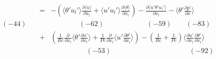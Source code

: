 \documentclass[a4paper,11pt]{article}
\begin{document}
\begin{eqnarray}
&=&-(\langle \theta'u_l'\rangle \frac{\partial \langle u \rangle  }{\partial x_l}
+\langle u'u_l'\rangle \frac{\partial \langle \theta \rangle  }{\partial x_l})
-\frac{\partial \langle u'\theta'u_l'\rangle}{\partial x_l}  %
-\langle \theta' \frac{\partial p' }{\partial x}\rangle \nonumber \\
(-44) \quad{}   && \quad{} \qquad{} \quad{} (-62)\qquad{}\qquad{}\qquad{} (-59)\qquad{} (-83) \nonumber \\
&+&(\frac{1}{Re}\frac{\partial }{\partial x_l}\langle \theta' \frac{\partial u' }{\partial x_l}\rangle+\frac{1}{Pe}\frac{\partial }{\partial x_l}\langle u'\frac{\partial \theta' }{\partial x_l}\rangle )
-(\frac{1}{Re}+\frac{1}{Pe})\langle \frac{\partial u' }{\partial x_l}\frac{\partial \theta' }{\partial x_l}\rangle  \\
&& \quad{}\qquad{} \quad{} \quad{}(-53)\qquad{}\qquad{}\qquad{}\qquad{}\quad{}\qquad{} (-92) \nonumber 
\end{eqnarray}
\end{document}
